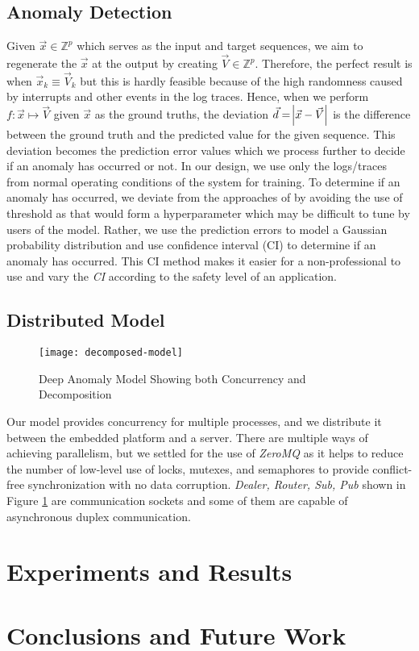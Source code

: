 \subsection{Anomaly Detection}
\label{subsec:anomaly}
Given $ \vec{x} \in \mathbb{Z}^{p} $ which serves as the input and target 
sequences, we aim to regenerate the $\vec{x}$ at the output by creating $ 
\vec{V} \in \mathbb{Z}^{p}$. Therefore, the perfect result is when $ 
\vec{x}_k  \equiv \vec{V}_k $ but this is hardly feasible because of the high 
randomness caused by interrupts and other events in the log traces. Hence, when 
we perform $ f:\vec{x}\mapsto \vec{V} $ given $ \vec{x} $ as the ground truths, 
the deviation $ \vec{d} = \abs{\vec{x} - \vec{V}} $ is the difference between 
the ground truth and the predicted value for the given sequence. This deviation 
becomes the prediction error values which we process further to decide if an 
anomaly has occurred or not. In our design, we use only the logs/traces from 
normal operating conditions of the system for training. To determine if an 
anomaly has occurred, we deviate from the approaches of 
\cite{malhotra2016lstm,malhotra2015long} by avoiding the use of threshold as 
that would form a hyperparameter which may be difficult to tune by users of the 
model. Rather, we use the prediction errors to model a Gaussian probability 
distribution and use confidence interval (CI) to determine if an anomaly 
has occurred. This CI method makes it easier for a non-professional to use and 
vary the \emph{CI} according to the safety level of an application.

\subsection{Distributed Model}
\label{subsec:distributed}
\begin{figure}[!t]
	\centering
	\texttt{[image: decomposed-model]}
	\caption{Deep Anomaly Model Showing both Concurrency and Decomposition}
	\label{fig:decomposed-model}
\end{figure}
Our model provides concurrency for multiple processes, and we distribute it 
between the embedded platform and a server. There are multiple ways of 
achieving parallelism, but we settled for the use of \emph{ZeroMQ} 
\cite{Akgul:ZEROMQ} as it helps to reduce the number of low-level use of locks, 
mutexes, and semaphores to provide conflict-free synchronization with no data 
corruption. \emph{Dealer, Router, Sub, Pub} shown in Figure 
\ref{fig:decomposed-model} are communication sockets and some of them are 
capable of asynchronous duplex communication.
\section{Experiments and Results}
\label{sec:experiments}

\section{Conclusions and Future Work}
\label{sec:conclusion}